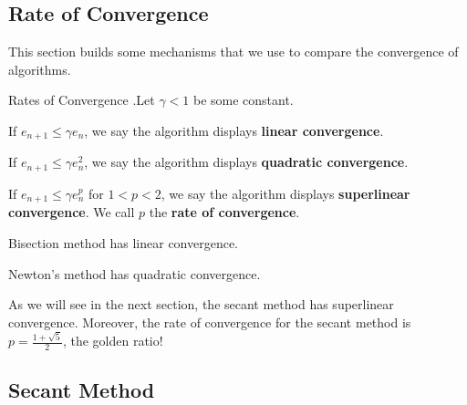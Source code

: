 \documentclass[12pt,letterpaper]{article}
\newcommand{\skipline}{\vspace{\baselineskip}}
\begin{document}
\subsection{Rate of Convergence}
This section builds some mechanisms that we use to compare the convergence of algorithms.

\begin{defn}{Rates of Convergence}
.Let $\gamma < 1$ be some constant.
\skipline

If $e_{n+1} \leq \gamma e_n$, we say the algorithm displays \textbf{linear convergence}.

If $e_{n+1} \leq \gamma e_n^2$, we say the algorithm displays \textbf{quadratic convergence}.

If $e_{n+1} \leq \gamma e_n^p$ for $1 < p < 2$, we say the algorithm displays \textbf{superlinear convergence}. We call $p$ the \textbf{rate of convergence}.
\end{defn}

Bisection method has linear convergence.

Newton's method has quadratic convergence.

As we will see in the next section, the secant method has superlinear convergence. Moreover, the rate of convergence for the secant method is $p = \frac{1 + \sqrt{5}}{2}$, the golden ratio!

\newpage
\subsection{Secant Method}

\begin{tikzpicture}

\end{tikzpicture}
\end{document}
